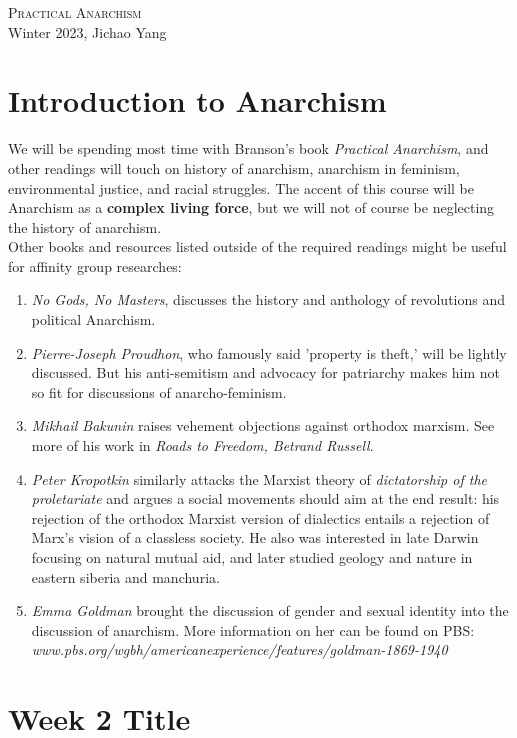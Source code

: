 \documentclass[12pt]{article}
\begin{document}
\begin{flushright}
    \textsc{\LARGE Practical Anarchism}\\
    Winter 2023, Jichao Yang
\end{flushright}

\section{Introduction to Anarchism}

We will be spending most time with Branson's book \textit{Practical Anarchism},
and other readings will touch on history of anarchism, anarchism in feminism, environmental justice, and racial struggles. The accent of this course will be Anarchism as a \textbf{complex living force}, but we will not of course be neglecting the history of anarchism.\\

Other books and resources listed outside of the required readings might be useful for affinity group researches:
\begin{enumerate}
    \item \textit{No Gods, No Masters}, discusses the history and anthology of revolutions and political Anarchism.
    \item \textit{Pierre-Joseph Proudhon}, who famously said 'property is theft,' will be lightly discussed. But his anti-semitism and advocacy for patriarchy makes him not so fit for discussions of anarcho-feminism.
    \item \textit{Mikhail Bakunin} raises vehement objections against orthodox marxism. See more of his work in \textit{Roads to Freedom, Betrand Russell}.
    \item \textit{Peter Kropotkin} similarly attacks the Marxist theory of \textit{dictatorship of the proletariate} and argues a social movements should aim at the end result: his rejection of the orthodox Marxist version of dialectics entails a rejection of Marx's vision of a classless society. He also was interested in late Darwin focusing on natural mutual aid, and later studied geology and nature in eastern siberia and manchuria.
    \item \textit{Emma Goldman} brought the discussion of gender and sexual identity into the discussion of anarchism. More information on her can be found on PBS:\\
    \textit{www.pbs.org/wgbh/americanexperience/features/goldman-1869-1940}
\end{enumerate}

\section{Week 2 Title}
\end{document}
